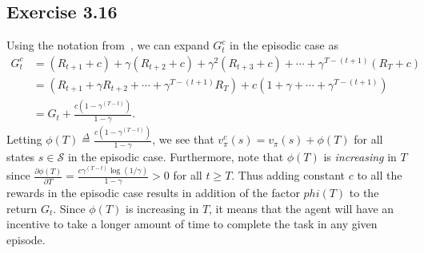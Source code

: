 \documentclass[10pt]{article}
\newcommand{\ldef}{\stackrel{\Delta}{=}}
\begin{document}
	\subsection*{Exercise 3.16}
	\label{ss:3.16}
	Using the notation from~, we can expand $G_t^c$ in the episodic case as
	\begin{align*}
	G_t^c &= (R_{t+1}+c) + \gamma(R_{t+2}+c) + \gamma^2 (R_{t+3}+c) + \cdots + \gamma^{T-(t+1)}(R_{T} + c)\\
	&= \left(R_{t+1} + \gamma R_{t+2} + \cdots + \gamma^{T-(t+1)}R_{T} \right) + c\left(1+\gamma+\cdots+\gamma^{T-(t+1)} \right)\\
	&= G_t + \frac{c(1-\gamma^{(T-t)})}{1-\gamma}.
	\end{align*}
	Letting $\phi(T) \ldef \frac{c(1-\gamma^{(T-t)})}{1-\gamma}$, we see that $v_\pi^c(s) = v_\pi(s) + \phi(T)$ for all states $s\in\mathcal{S}$ in the episodic case. Furthermore, note that $\phi(T)$ is \emph{increasing} in $T$ since $\frac{\partial \phi(T)}{\partial T} = \frac{c\gamma^{(T-t)}\log(1/\gamma)}{1-\gamma}>0$ for all $t\geq T$. Thus adding constant $c$ to all the rewards in the episodic case results in addition of the factor $phi(T)$ to the return $G_t$. Since $\phi(T)$ is increasing in $T$, it means that the agent will have an incentive to take a longer amount of time to complete the task in any given episode.
\end{document}
